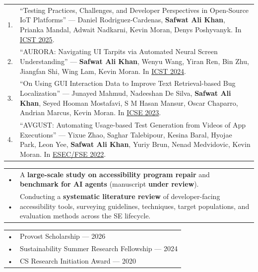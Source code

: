 \documentclass[a4paper]{MagicalCV}
\begin{document}
\hfill
\begin{minipage}[t]{0.66\textwidth}

\vspace{\topsep}

\begin{tabular}{@{}p{0.02cm}p{11cm}@{}}
1. & ``Testing Practices, Challenges, and Developer Perspectives in Open-Source IoT Platforms'' — Daniel Rodriguez-Cardenas, \textbf{Safwat Ali Khan}, Prianka Mandal, Adwait Nadkarni, Kevin Moran, Denys Poshyvanyk. In \href{https://conf.researchr.org/home/icst-2025}{ICST 2025}. \\[0.3em]

2. & ``AURORA: Navigating UI Tarpits via Automated Neural Screen Understanding'' — \textbf{Safwat Ali Khan}, Wenyu Wang, Yiran Ren, Bin Zhu, Jiangfan Shi, Wing Lam, Kevin Moran. In \href{https://ieeexplore.ieee.org/document/10638617}{ICST 2024}. \\[0.3em]

3. & ``On Using GUI Interaction Data to Improve Text Retrieval-based Bug Localization'' — Junayed Mahmud, Nadeeshan De Silva, \textbf{Safwat Ali Khan}, Seyed Hooman Mostafavi, S M Hasan Mansur, Oscar Chaparro, Andrian Marcus, Kevin Moran. In \href{https://dl.acm.org/doi/10.1145/3597503.3608139}{ICSE 2023}. \\[0.3em]

4. & ``AVGUST: Automating Usage-based Test Generation from Videos of App Executions'' — Yixue Zhao, Saghar Talebipour, Kesina Baral, Hyojae Park, Leon Yee, \textbf{Safwat Ali Khan}, Yuriy Brun, Nenad Medvidovic, Kevin Moran. In \href{https://dl.acm.org/doi/10.1145/3540250.3549134}{ESEC/FSE 2022}. \\
\end{tabular}



\begin{tabular}{@{}p{0.02cm}p{11cm}@{}}
• & A \textbf{large-scale study on accessibility program repair} and \textbf{benchmark for AI agents} (manuscript \textbf{under review}). \\
• & Conducting a \textbf{systematic literature review} of developer-facing accessibility tools, surveying guidelines, techniques, target populations, and evaluation methods across the SE lifecycle. \\
\end{tabular}

\begin{tabular}{@{}p{0.02cm}p{11cm}@{}}
• & {Provost Scholarship} — 2026 \\
• & {Sustainability Summer Research Fellowship} — 2024 \\
• & {CS Research Initiation Award} — 2020 \\
\end{tabular}




\end{minipage}
\end{document}
